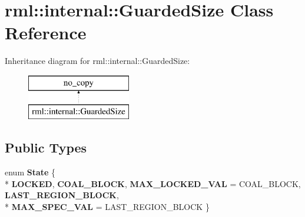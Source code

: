 \hypertarget{classrml_1_1internal_1_1GuardedSize}{}\section{rml\+:\+:internal\+:\+:Guarded\+Size Class Reference}
\label{classrml_1_1internal_1_1GuardedSize}
Inheritance diagram for rml\+:\+:internal\+:\+:Guarded\+Size\+:\begin{figure}[H]
\begin{center}
\leavevmode
\includegraphics[height=2.000000cm]{classrml_1_1internal_1_1GuardedSize}
\end{center}
\end{figure}
\subsection*{Public Types}
\begin{DoxyCompactItemize}
\item 
\hypertarget{classrml_1_1internal_1_1GuardedSize_a101bd64153c2bea266a3abcf51597915}{}enum {\bfseries State} \{ \\*
{\bfseries L\+O\+C\+K\+E\+D}, 
{\bfseries C\+O\+A\+L\+\_\+\+B\+L\+O\+C\+K}, 
{\bfseries M\+A\+X\+\_\+\+L\+O\+C\+K\+E\+D\+\_\+\+V\+A\+L} = C\+O\+A\+L\+\_\+\+B\+L\+O\+C\+K, 
{\bfseries L\+A\+S\+T\+\_\+\+R\+E\+G\+I\+O\+N\+\_\+\+B\+L\+O\+C\+K}, 
\\*
{\bfseries M\+A\+X\+\_\+\+S\+P\+E\+C\+\_\+\+V\+A\+L} = L\+A\+S\+T\+\_\+\+R\+E\+G\+I\+O\+N\+\_\+\+B\+L\+O\+C\+K
 \}\label{classrml_1_1internal_1_1GuardedSize_a101bd64153c2bea266a3abcf51597915}

\end{DoxyCompactItemize}
